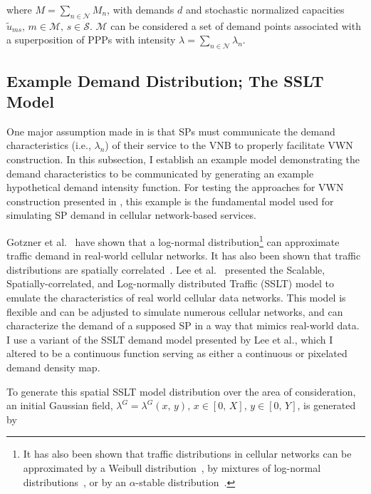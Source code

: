 \documentclass[12pt,dvipsnames]{report}
\begin{document}
\noindent where $M = \sum_{n \in \mathcal{N}} M_n$, with demands $d$ and stochastic normalized capacities $\tilde{u}_{ms},\, m \in \mathcal{M},\, s \in \mathcal{S}$.  $\mathcal{M}$ can be considered a set of demand points associated with a superposition of PPPs with intensity $\lambda = \sum_{n \in \mathcal{N}} \lambda_n$.

\subsection{Example Demand Distribution; The SSLT Model} \label{subsec:networkdefs_sslt}

One major assumption made in  is that SPs must communicate the demand characteristics (i.e., $\lambda_n$) of their service to the VNB to properly facilitate VWN construction.  In this subsection, I establish an example model demonstrating the demand characteristics to be communicated by generating an example hypothetical demand intensity function.  For testing the approaches for VWN construction presented in , this example is the fundamental model used for simulating SP demand in cellular network-based services.

Gotzner et al.~\cite{686105} have shown that a log-normal distribution\footnote{It has also been shown that traffic distributions in cellular networks can be approximated by a Weibull distribution~\cite{6757900}, by mixtures of log-normal distributions~\cite{5936263, 6757900}, or by an $\alpha$-stable distribution~\cite{7202841}.} can approximate traffic demand in real-world cellular networks.  It has also been shown that traffic distributions are spatially correlated~\cite{5936263, eigenplaces}.  Lee et al.~\cite{6554749, 6757900} presented the Scalable, Spatially-correlated, and Log-normally distributed Traffic (SSLT) model to emulate the characteristics of real world cellular data networks.  This model is flexible and can be adjusted to simulate numerous cellular networks, and can characterize the demand of a supposed SP in a way that mimics real-world data.  I use a variant of the SSLT demand model presented by Lee et al., which I altered to be a continuous function serving as either a continuous or pixelated demand density map.

To generate this spatial SSLT model distribution over the area of consideration, an initial Gaussian field, $\lambda^G = \lambda^G\left( x,\, y \right),\, x \in \left[ 0,\, X \right],\, y \in \left[ 0,\, Y \right]$, is generated by
\end{document}
